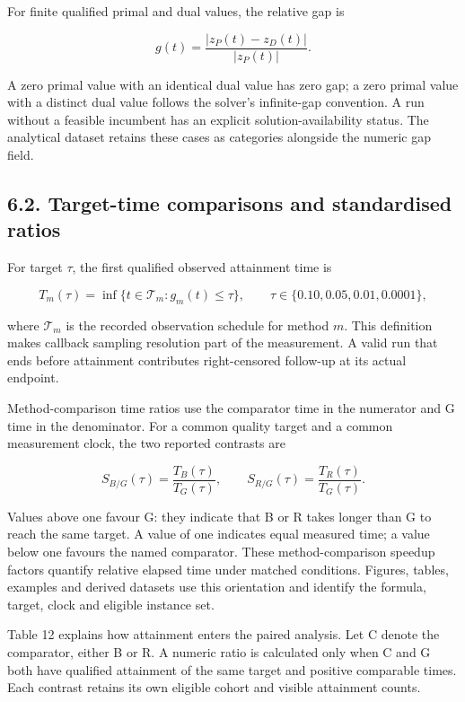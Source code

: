 \documentclass[
  british,
  10pt,
]{article}
\begin{document}
For finite qualified primal and dual values, the relative gap is

\[
g(t)=\frac{|z_P(t)-z_D(t)|}{|z_P(t)|}.
\tag{3}
\]

A zero primal value with an identical dual value has zero gap; a zero
primal value with a distinct dual value follows the solver's
infinite-gap convention. A run without a feasible incumbent has an
explicit solution-availability status. The analytical dataset retains
these cases as categories alongside the numeric gap field.

\subsection{6.2. Target-time comparisons and standardised
ratios}\label{target-time-comparisons-and-standardised-ratios}

For target \(\tau\), the first qualified observed attainment time is

\[
T_m(\tau)=\inf\{t\in\mathcal T_m:g_m(t)\le\tau\},
\qquad \tau\in\{0.10,0.05,0.01,0.0001\},
\tag{4}
\]

where \(\mathcal T_m\) is the recorded observation schedule for method
\(m\). This definition makes callback sampling resolution part of the
measurement. A valid run that ends before attainment contributes
right-censored follow-up at its actual endpoint.

Method-comparison time ratios use the comparator time in the numerator
and G time in the denominator. For a common quality target and a common
measurement clock, the two reported contrasts are

\[
S_{B/G}(\tau)=\frac{T_B(\tau)}{T_G(\tau)},\qquad
S_{R/G}(\tau)=\frac{T_R(\tau)}{T_G(\tau)}.
\tag{5}
\]

Values above one favour G: they indicate that B or R takes longer than G
to reach the same target. A value of one indicates equal measured time;
a value below one favours the named comparator. These method-comparison
speedup factors quantify relative elapsed time under matched conditions.
Figures, tables, examples and derived datasets use this orientation and
identify the formula, target, clock and eligible instance set.

Table 12 explains how attainment enters the paired analysis. Let C
denote the comparator, either B or R. A numeric ratio is calculated only
when C and G both have qualified attainment of the same target and
positive comparable times. Each contrast retains its own eligible cohort
and visible attainment counts.
\end{document}
